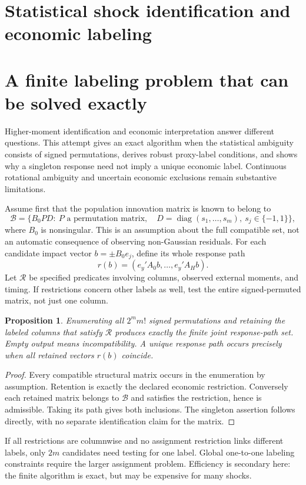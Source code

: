 \documentclass[11pt,a4paper]{article}
\newtheorem{proposition}[theorem]{Proposition}
\begin{document}
\section*{Statistical shock identification and economic labeling}
\section{A finite labeling problem that can be solved exactly}
Higher-moment identification and economic interpretation answer different questions. This attempt gives an exact algorithm when the statistical ambiguity consists of signed permutations, derives robust proxy-label conditions, and shows why a singleton response need not imply a unique economic label. Continuous rotational ambiguity and uncertain economic exclusions remain substantive limitations.

Assume first that the population innovation matrix is known to belong to
\[
 \mathcal B=\{B_0PD:\ P\text{ a permutation matrix},\quad
 D=\operatorname{diag}(s_1,\ldots,s_m),\ s_j\in\{-1,1\}\},
\]
where $B_0$ is nonsingular. This is an assumption about the full compatible set, not an automatic consequence of observing non-Gaussian residuals. For each candidate impact vector $b=\pm B_0e_j$, define its whole response path
\[
 r(b)=(e_y'A_0b,\ldots,e_y'A_Hb).
\]
Let $\mathcal R$ be specified predicates involving columns, observed external moments, and timing. If restrictions concern other labels as well, test the entire signed-permuted matrix, not just one column.
\begin{proposition}
Enumerating all $2^m m!$ signed permutations and retaining the labeled columns that satisfy $\mathcal R$ produces exactly the finite joint response-path set. Empty output means incompatibility. A unique response path occurs precisely when all retained vectors $r(b)$ coincide.
\end{proposition}
\begin{proof}
Every compatible structural matrix occurs in the enumeration by assumption. Retention is exactly the declared economic restriction. Conversely each retained matrix belongs to $\mathcal B$ and satisfies the restriction, hence is admissible. Taking its path gives both inclusions. The singleton assertion follows directly, with no separate identification claim for the matrix.
\end{proof}
If all restrictions are columnwise and no assignment restriction links different labels, only $2m$ candidates need testing for one label. Global one-to-one labeling constraints require the larger assignment problem. Efficiency is secondary here: the finite algorithm is exact, but may be expensive for many shocks.
\end{document}
